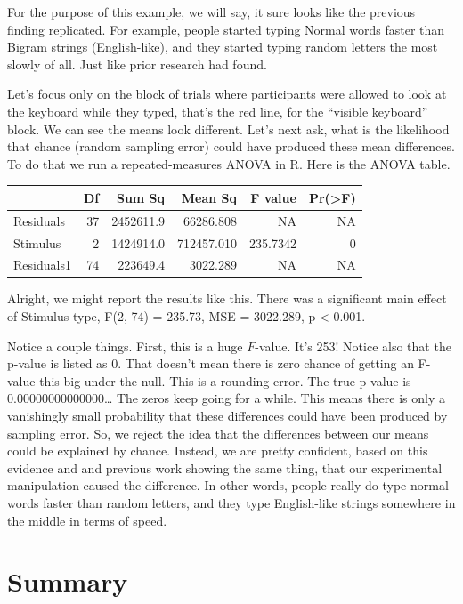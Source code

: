 \documentclass[
  letterpaper,
  DIV=11,
  numbers=noendperiod]{scrreprt}
\begin{document}
For the purpose of this example, we will say, it sure looks like the
previous finding replicated. For example, people started typing Normal
words faster than Bigram strings (English-like), and they started typing
random letters the most slowly of all. Just like prior research had
found.

Let's focus only on the block of trials where participants were allowed
to look at the keyboard while they typed, that's the red line, for the
``visible keyboard'' block. We can see the means look different. Let's
next ask, what is the likelihood that chance (random sampling error)
could have produced these mean differences. To do that we run a
repeated-measures ANOVA in R. Here is the ANOVA table.

\begin{longtable}[]{@{}lrrrrr@{}}
\toprule\noalign{}
& Df & Sum Sq & Mean Sq & F value & Pr(\textgreater F) \\
\midrule\noalign{}
\endhead
\bottomrule\noalign{}
\endlastfoot
Residuals & 37 & 2452611.9 & 66286.808 & NA & NA \\
Stimulus & 2 & 1424914.0 & 712457.010 & 235.7342 & 0 \\
Residuals1 & 74 & 223649.4 & 3022.289 & NA & NA \\
\end{longtable}

Alright, we might report the results like this. There was a significant
main effect of Stimulus type, F(2, 74) = 235.73, MSE = 3022.289, p
\textless{} 0.001.

Notice a couple things. First, this is a huge \(F\)-value. It's 253!
Notice also that the p-value is listed as 0. That doesn't mean there is
zero chance of getting an F-value this big under the null. This is a
rounding error. The true p-value is 0.00000000000000\ldots{} The zeros
keep going for a while. This means there is only a vanishingly small
probability that these differences could have been produced by sampling
error. So, we reject the idea that the differences between our means
could be explained by chance. Instead, we are pretty confident, based on
this evidence and and previous work showing the same thing, that our
experimental manipulation caused the difference. In other words, people
really do type normal words faster than random letters, and they type
English-like strings somewhere in the middle in terms of speed.

\section{Summary}\label{summary-3}
\end{document}
